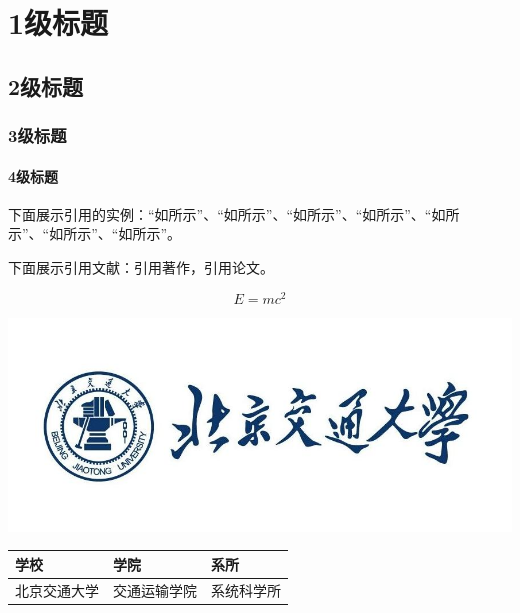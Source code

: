 \chapter{1级标题}\label{cha_one}
\section{2级标题}\label{sec_two}
\subsection{3级标题}\label{subsec_three}
\subsubsection{4级标题}\label{subsubsec_four}

下面展示引用的实例：“如所示”、“如所示”、“如所示”、“如所示”、“如所示”、“如所示”、“如所示”。

下面展示引用文献：引用著作，引用论文。

\begin{equation}\label{eq_emc}
	E=mc^2
\end{equation}

\begin{bjtufigure}
	\includegraphics[width=.9\textwidth]{contents/annex/badge}
\end{bjtufigure}


\begin{bjtutable}
	\begin{tabularx}{\textwidth}{X<{\centering}X<{\centering}X<{\centering}}
		\toprule
		学校&学院&系所\\
		\midrule
		北京交通大学&交通运输学院&系统科学所\\
		\bottomrule
	\end{tabularx}
\end{bjtutable}

